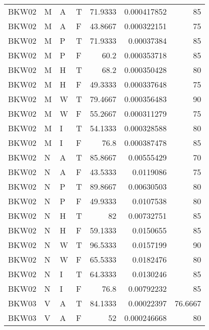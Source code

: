 \begin{longtable}{llllrrr}
    BKW02    & M     & A     & T          & 71.9333    & 0.000417852 & 85       \\
    BKW02    & M     & A     & F          & 43.8667    & 0.000322151 & 75       \\
    BKW02    & M     & P     & T          & 71.9333    & 0.00037384  & 85       \\
    BKW02    & M     & P     & F          & 60.2       & 0.000353718 & 85       \\
    BKW02    & M     & H     & T          & 68.2       & 0.000350428 & 80       \\
    BKW02    & M     & H     & F          & 49.3333    & 0.000337648 & 75       \\
    BKW02    & M     & W     & T          & 79.4667    & 0.000356483 & 90       \\
    BKW02    & M     & W     & F          & 55.2667    & 0.000311279 & 75       \\
    BKW02    & M     & I     & T          & 54.1333    & 0.000328588 & 80       \\
    BKW02    & M     & I     & F          & 76.8       & 0.000387478 & 85       \\
    BKW02    & N     & A     & T          & 85.8667    & 0.00555429  & 70       \\
    BKW02    & N     & A     & F          & 43.5333    & 0.0119086   & 75       \\
    BKW02    & N     & P     & T          & 89.8667    & 0.00630503  & 80       \\
    BKW02    & N     & P     & F          & 49.9333    & 0.0107538   & 80       \\
    BKW02    & N     & H     & T          & 82         & 0.00732751  & 85       \\
    BKW02    & N     & H     & F          & 59.1333    & 0.0150655   & 85       \\
    BKW02    & N     & W     & T          & 96.5333    & 0.0157199   & 90       \\
    BKW02    & N     & W     & F          & 65.5333    & 0.0182476   & 80       \\
    BKW02    & N     & I     & T          & 64.3333    & 0.0130246   & 85       \\
    BKW02    & N     & I     & F          & 76.8       & 0.00792232  & 85       \\
    BKW03    & V     & A     & T          & 84.1333    & 0.00022397  & 76.6667  \\
    BKW03    & V     & A     & F          & 52         & 0.000246668 & 80       \\

\end{longtable}
